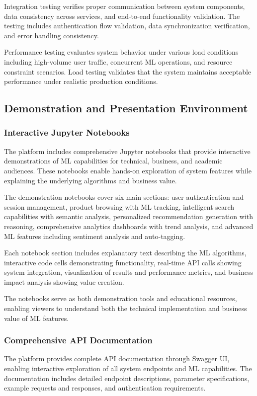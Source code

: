 \documentclass[12pt]{article}
\begin{document}
Integration testing verifies proper communication between system components, data consistency across services, and end-to-end functionality validation. The testing includes authentication flow validation, data synchronization verification, and error handling consistency.

Performance testing evaluates system behavior under various load conditions including high-volume user traffic, concurrent ML operations, and resource constraint scenarios. Load testing validates that the system maintains acceptable performance under realistic production conditions.

\subsection{Demonstration and Presentation Environment}

\subsubsection{Interactive Jupyter Notebooks}
The platform includes comprehensive Jupyter notebooks that provide interactive demonstrations of ML capabilities for technical, business, and academic audiences. These notebooks enable hands-on exploration of system features while explaining the underlying algorithms and business value.

The demonstration notebooks cover six main sections: user authentication and session management, product browsing with ML tracking, intelligent search capabilities with semantic analysis, personalized recommendation generation with reasoning, comprehensive analytics dashboards with trend analysis, and advanced ML features including sentiment analysis and auto-tagging.

Each notebook section includes explanatory text describing the ML algorithms, interactive code cells demonstrating functionality, real-time API calls showing system integration, visualization of results and performance metrics, and business impact analysis showing value creation.

The notebooks serve as both demonstration tools and educational resources, enabling viewers to understand both the technical implementation and business value of ML features.

\subsubsection{Comprehensive API Documentation}
The platform provides complete API documentation through Swagger UI, enabling interactive exploration of all system endpoints and ML capabilities. The documentation includes detailed endpoint descriptions, parameter specifications, example requests and responses, and authentication requirements.
\end{document}
